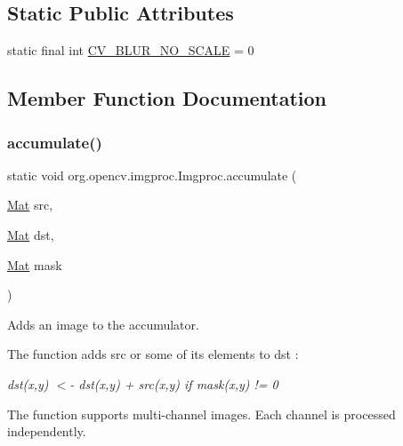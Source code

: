 \subsection*{Static Public Attributes}
\begin{DoxyCompactItemize}
\item 
static final int \mbox{\hyperlink{classorg_1_1opencv_1_1imgproc_1_1_imgproc_abf7d30bf7b45f87ff811c486d74a6e66}{C\+V\+\_\+\+B\+L\+U\+R\+\_\+\+N\+O\+\_\+\+S\+C\+A\+LE}} = 0
\end{DoxyCompactItemize}


\subsection{Member Function Documentation}
\mbox{\label{classorg_1_1opencv_1_1imgproc_1_1_imgproc_a9258592f2447fc25785020eee8cc78f7}} 
\subsubsection{\texorpdfstring{accumulate()}{accumulate()}\hspace{0.1cm}{\footnotesize\ttfamily [1/2]}}
{\footnotesize\ttfamily static void org.\+opencv.\+imgproc.\+Imgproc.\+accumulate (\begin{DoxyParamCaption}\item[{\mbox{\hyperlink{classorg_1_1opencv_1_1core_1_1_mat}{Mat}}}]{src,  }\item[{\mbox{\hyperlink{classorg_1_1opencv_1_1core_1_1_mat}{Mat}}}]{dst,  }\item[{\mbox{\hyperlink{classorg_1_1opencv_1_1core_1_1_mat}{Mat}}}]{mask }\end{DoxyParamCaption})\hspace{0.3cm}{\ttfamily [static]}}

Adds an image to the accumulator.

The function adds {\ttfamily src} or some of its elements to {\ttfamily dst} \+:

{\itshape dst(x,y) $<$-\/ dst(x,y) + src(x,y) if mask(x,y) != 0}

The function supports multi-\/channel images. Each channel is processed independently.

